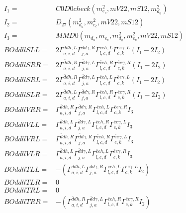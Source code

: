 \documentclass[A4,landscape]{article}
\begin{document}
\begin{align} 
I_1 = & C0D0check(m^2_{e_{{c}}}, mV22, mS12, m^2_{d_{{a}}}) \\ 
I_2 = & D_{27}(m^2_{d_{{a}}}, m^2_{e_{{c}}}, mV22, mS12) \\ 
I_3 = & MMD0(m_{d_{{a}}}, m_{e_{{c}}}, m^2_{d_{{a}}}, m^2_{e_{{c}}}, mV22, mS12) \\ 
  BOddllSLL= & 2  \Gamma^{\bar{d}d h ,L}_{a, i, d} \Gamma^{\bar{d}d \gamma ,R}_{j, a} \Gamma^{\bar{e}e h ,L}_{l, c, d} \Gamma^{\bar{e}e \gamma ,L}_{c, k} (I_1 - 2 I_2) \\ 
  BOddllSRR= & 2  \Gamma^{\bar{d}d h ,R}_{a, i, d} \Gamma^{\bar{d}d \gamma ,L}_{j, a} \Gamma^{\bar{e}e h ,R}_{l, c, d} \Gamma^{\bar{e}e \gamma ,R}_{c, k} (I_1 - 2 I_2) \\ 
  BOddllSRL= & 2  \Gamma^{\bar{d}d h ,R}_{a, i, d} \Gamma^{\bar{d}d \gamma ,L}_{j, a} \Gamma^{\bar{e}e h ,L}_{l, c, d} \Gamma^{\bar{e}e \gamma ,L}_{c, k} (I_1 - 2 I_2) \\ 
  BOddllSLR= & 2  \Gamma^{\bar{d}d h ,L}_{a, i, d} \Gamma^{\bar{d}d \gamma ,R}_{j, a} \Gamma^{\bar{e}e h ,R}_{l, c, d} \Gamma^{\bar{e}e \gamma ,R}_{c, k} (I_1 - 2 I_2) \\ 
  BOddllVRR= &  \Gamma^{\bar{d}d h ,R}_{a, i, d} \Gamma^{\bar{d}d \gamma ,R}_{j, a} \Gamma^{\bar{e}e h ,L}_{l, c, d} \Gamma^{\bar{e}e \gamma ,R}_{c, k} I_3 \\ 
  BOddllVLL= &  \Gamma^{\bar{d}d h ,L}_{a, i, d} \Gamma^{\bar{d}d \gamma ,L}_{j, a} \Gamma^{\bar{e}e h ,R}_{l, c, d} \Gamma^{\bar{e}e \gamma ,L}_{c, k} I_3 \\ 
  BOddllVRL= &  \Gamma^{\bar{d}d h ,R}_{a, i, d} \Gamma^{\bar{d}d \gamma ,R}_{j, a} \Gamma^{\bar{e}e h ,R}_{l, c, d} \Gamma^{\bar{e}e \gamma ,L}_{c, k} I_3 \\ 
  BOddllVLR= &  \Gamma^{\bar{d}d h ,L}_{a, i, d} \Gamma^{\bar{d}d \gamma ,L}_{j, a} \Gamma^{\bar{e}e h ,L}_{l, c, d} \Gamma^{\bar{e}e \gamma ,R}_{c, k} I_3 \\ 
  BOddllTLL= & -( \Gamma^{\bar{d}d h ,L}_{a, i, d} \Gamma^{\bar{d}d \gamma ,R}_{j, a} \Gamma^{\bar{e}e h ,L}_{l, c, d} \Gamma^{\bar{e}e \gamma ,L}_{c, k} I_2) \\ 
  BOddllTLR= & 0 \\ 
  BOddllTRL= & 0 \\ 
  BOddllTRR= & -( \Gamma^{\bar{d}d h ,R}_{a, i, d} \Gamma^{\bar{d}d \gamma ,L}_{j, a} \Gamma^{\bar{e}e h ,R}_{l, c, d} \Gamma^{\bar{e}e \gamma ,R}_{c, k} I_2) \\ 
\end{align} 
\end{document}
